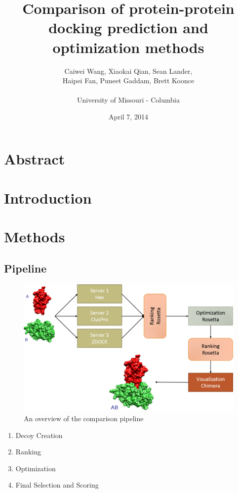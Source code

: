 \documentclass{article}
\title{Comparison of protein-protein docking prediction and optimization methods}
\author{Caiwei Wang, Xiaokai Qian, Sean Lander, \\Haipei Fan, Puneet Gaddam, Brett Koonce\\\\University of Missouri - Columbia}
\date{April 7, 2014}
\begin{document}
\maketitle

\section{Abstract}



\section{Introduction}



\section{Methods}



\subsection{Pipeline}

\begin{figure}[H]
\begin{center}
\includegraphics[width=\textwidth]{pipeline}
\caption{An overview of the comparison pipeline}
\label{Fig:blosum}
\end{center}
\end{figure}

\begin{enumerate}
\item Decoy Creation

\item Ranking

\item Optimization

\item Final Selection and Scoring
\end{enumerate}
\end{document}
